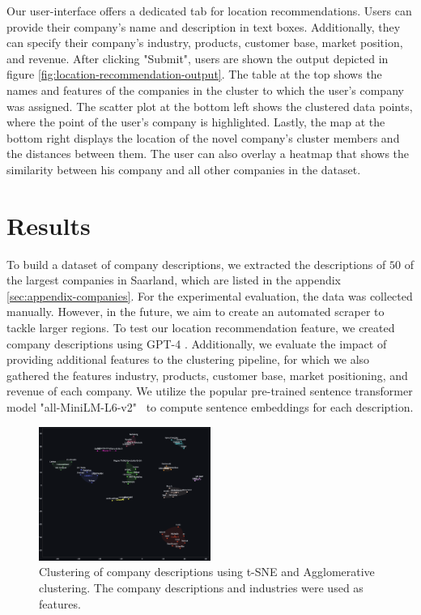\documentclass[12pt]{article}
\begin{document}
   Our user-interface offers a dedicated tab for location recommendations. Users can provide their company's name and description in text boxes. Additionally, they can specify their company's industry, products, customer base, market position, and revenue. After clicking "Submit", users are shown the output depicted in figure \ref{fig:location-recommendation-output}. The table at the top shows the names and features of the companies in the cluster to which the user's company was assigned. The scatter plot at the bottom left shows the clustered data points, where the point of the user's company is highlighted. Lastly, the map at the bottom right displays the location of the novel company's cluster members and the distances between them. The user can also overlay a heatmap that shows the similarity between his company and all other companies in the dataset.
   
   \section*{Results}
   To build a dataset of company descriptions, we extracted the descriptions of $50$ of the largest companies in Saarland, which are listed in the appendix \ref{sec:appendix-companies}.
   For the experimental evaluation, the data was collected manually. However, in the future, we aim to create an automated scraper to tackle larger regions. To test our location recommendation feature, we created company descriptions using GPT-4 \cite{chatgpt}.
   Additionally, we evaluate the impact of providing additional features to the clustering pipeline, for which we also gathered the features industry, products, customer base, market positioning, and revenue of each company. 
   We utilize the popular pre-trained sentence transformer model "all-MiniLM-L6-v2"~\cite{sentence-transformer-model} to compute sentence embeddings for each description.  
   
   \begin{figure}[H]
   	\centering
   	\includegraphics[width=0.5\textwidth]{figures/clustering_results.png}
   	\caption{Clustering of company descriptions using t-SNE and Agglomerative clustering. The company descriptions and industries were used as features.}
   	\label{fig:t-sne-agglomerative}
   \end{figure}
   
\end{document}
